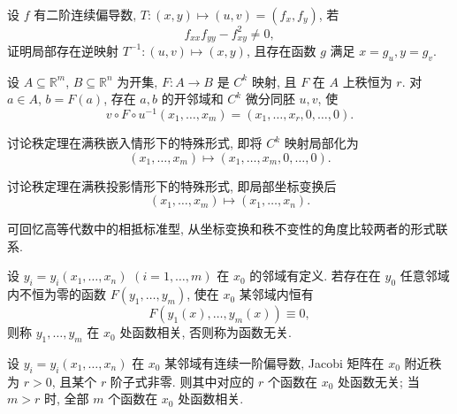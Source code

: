 \documentclass[../数学分析培优讲义.tex]{subfiles}
\begin{document}
\begin{example}
设 $f$ 有二阶连续偏导数, $T:(x,y)\mapsto(u,v)=(f_x,f_y)$, 若
\[
    f_{xx}f_{yy}-f_{xy}^2\ne0,
\]
证明局部存在逆映射 $T^{-1}:(u,v)\mapsto(x,y)$, 且存在函数 $g$ 满足 $x=g_u,y=g_v$.
\end{example}
\exampleblank


\newpage


\begin{theorem}
设 $A\subseteq\mathbb{R}^m$, $B\subseteq\mathbb{R}^n$ 为开集, $F:A\to B$ 是 $C^k$ 映射, 且 $F$ 在 $A$ 上秩恒为 $r$. 对 $a\in A$, $b=F(a)$, 存在 $a,b$ 的开邻域和 $C^k$ 微分同胚 $u,v$, 使
\[
    v\circ F\circ u^{-1}(x_1,\ldots,x_m)
    =(x_1,\ldots,x_r,0,\ldots,0).
\]
\end{theorem}

\begin{example}
讨论秩定理在满秩嵌入情形下的特殊形式, 即将 $C^k$ 映射局部化为
\[
    (x_1,\ldots,x_m)\mapsto(x_1,\ldots,x_m,0,\ldots,0).
\]
\end{example}
\exampleblank

\begin{example}
讨论秩定理在满秩投影情形下的特殊形式, 即局部坐标变换后
\[
    (x_1,\ldots,x_m)\mapsto(x_1,\ldots,x_n).
\]
\end{example}
\exampleblank

\begin{remark}
可回忆高等代数中的相抵标准型, 从坐标变换和秩不变性的角度比较两者的形式联系.
\end{remark}


\newpage


\begin{definition}
设 $y_i=y_i(x_1,\ldots,x_n)$ $(i=1,\ldots,m)$ 在 $x_0$ 的邻域有定义. 若存在在 $y_0$ 任意邻域内不恒为零的函数 $F(y_1,\ldots,y_m)$, 使在 $x_0$ 某邻域内恒有
\[
    F(y_1(x),\ldots,y_m(x))\equiv0,
\]
则称 $y_1,\ldots,y_m$ 在 $x_0$ 处函数相关, 否则称为函数无关.
\end{definition}

\begin{theorem}[\markstar]
设 $y_i=y_i(x_1,\ldots,x_n)$ 在 $x_0$ 某邻域有连续一阶偏导数, Jacobi 矩阵在 $x_0$ 附近秩为 $r>0$, 且某个 $r$ 阶子式非零. 则其中对应的 $r$ 个函数在 $x_0$ 处函数无关; 当 $m>r$ 时, 全部 $m$ 个函数在 $x_0$ 处函数相关.
\end{theorem}
\end{document}
